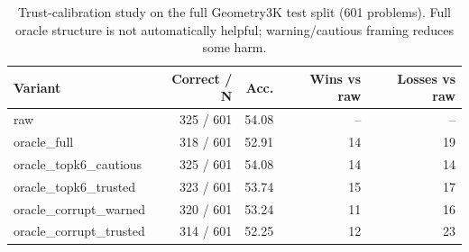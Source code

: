 \begin{table}[t]
\centering
\caption{Trust-calibration study on the full Geometry3K test split (601 problems). Full oracle structure is not automatically helpful; warning/cautious framing reduces some harm.}
\label{tab:trust601}
\small
\begin{tabular}{lrrrr}
\toprule
Variant & Correct / N & Acc. & Wins vs raw & Losses vs raw \\
\midrule
raw & 325 / 601 & 54.08 & -- & -- \\
oracle\_full & 318 / 601 & 52.91 & 14 & 19 \\
oracle\_topk6\_cautious & 325 / 601 & 54.08 & 14 & 14 \\
oracle\_topk6\_trusted & 323 / 601 & 53.74 & 15 & 17 \\
oracle\_corrupt\_warned & 320 / 601 & 53.24 & 11 & 16 \\
oracle\_corrupt\_trusted & 314 / 601 & 52.25 & 12 & 23 \\
\bottomrule
\end{tabular}
\end{table}
